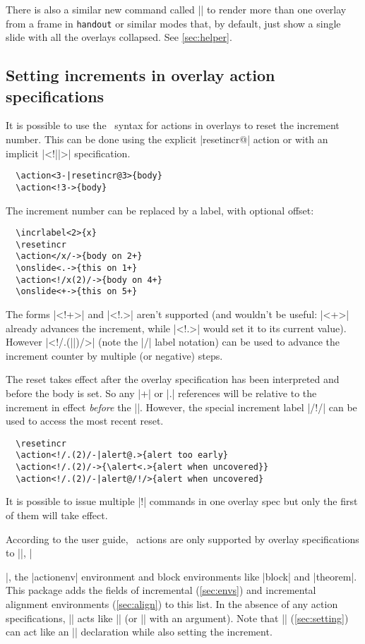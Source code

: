 \documentclass[a4paper]{ltxdoc}
\begin{document}
There is also a similar new command called |\handoutframe| to render more than
one overlay from a frame in \texttt{handout} or similar modes that, by default,
just show a single slide with all the overlays collapsed.  See \cref{sec:helper}.

\subsection{Setting increments in overlay action specifications} \label{sec:labels:setting}

It is possible to use the \beamer\ syntax for actions in overlays to reset the
increment number.  This can be done using the explicit |resetincr@| action or
with an implicit |<!||>| specification.  \example
\begin{verbatim}
  \action<3-|resetincr@3>{body}
  \action<!3->{body}
\end{verbatim}
The increment number can be replaced by a label, with optional offset:
\begin{verbatim}
  \incrlabel<2>{x}
  \resetincr
  \action</x/->{body on 2+}
  \onslide<.->{this on 1+}
  \action<!/x(2)/->{body on 4+}
  \onslide<+->{this on 5+}
\end{verbatim}
The forms |<!+>| and |<!.>| aren't supported (and wouldn't be useful: |<+>|
already advances the increment, while |<!.>| would set it to its current value).
However |<!/.(||)/>| (note the |/| label notation) can be used to advance the
increment counter by multiple (or negative) steps.

The reset takes effect after the overlay specification has been interpreted and
before the body is set.  So any |+| or |.| references will be relative to the
increment in effect \emph{before} the |\action|.  However, the special increment
label |/!/| can be used to access the most recent reset.  \example
\begin{verbatim}
  \resetincr
  \action<!/.(2)/-|alert@.>{alert too early}
  \action<!/.(2)/->{\alert<.>{alert when uncovered}}
  \action<!/.(2)/-|alert@/!/>{alert when uncovered}
\end{verbatim}
It is possible to issue multiple |!| commands in one overlay spec but only the
first of them will take effect.

According to the user guide, \beamer\ actions are only supported by overlay
specifications to |\action|, |\item|, the |actionenv| environment and block
environments like |block| and |theorem|.  This package adds the fields of
incremental (\cref{sec:envs}) and incremental alignment environments
(\cref{sec:align}) to this list.  In the absence of any action specifications,
|\action| acts like |\uncover| (or |\onslide| with an argument).  Note that
|\fromslide| (\cref{sec:setting}) can act like an |\onslide| declaration while
also setting the increment.
\end{document}

